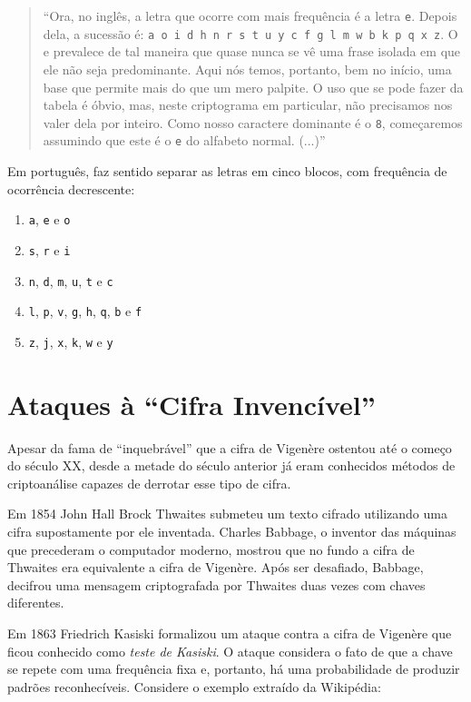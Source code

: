 \begin{quote}
``Ora, no inglês, a letra que ocorre com mais frequência é a letra {\tt e}. 
Depois dela, a sucessão é: {\tt a o i d h n r s t u y c f g l m w b k p q x z}. 
O e prevalece de tal maneira que quase nunca se vê uma frase isolada em que ele não seja predominante. 
Aqui nós temos, portanto, bem no início, uma base que permite mais do que um mero palpite. 
O uso que se pode fazer da tabela é óbvio, mas, neste criptograma em particular, não precisamos nos valer dela por inteiro. 
Como nosso caractere dominante é o {\tt 8}, começaremos assumindo que este é o {\tt e} do alfabeto normal. (...)''
\end{quote}

Em português, faz sentido separar as letras em cinco blocos, com frequência de ocorrência decrescente:
\begin{enumerate}
\item {\tt a}, {\tt e} e {\tt o}
\item {\tt s}, {\tt r} e {\tt i}
\item {\tt n}, {\tt d}, {\tt m}, {\tt u}, {\tt t} e {\tt c}
\item {\tt l}, {\tt p}, {\tt v}, {\tt g}, {\tt h}, {\tt q}, {\tt b} e {\tt f}
\item {\tt z}, {\tt j}, {\tt x}, {\tt k}, {\tt w} e {\tt y}
\end{enumerate}

\section{Ataques à ``Cifra Invencível''}
\label{sec:criptoanalise-vegenere}

Apesar da fama de ``inquebrável'' que a cifra de Vigenère ostentou até o começo do século XX, desde a metade do século anterior já eram conhecidos métodos de criptoanálise capazes de derrotar esse tipo de cifra.

Em 1854 John Hall Brock Thwaites submeteu um texto cifrado utilizando uma cifra supostamente por ele inventada.
Charles Babbage, o inventor das máquinas que precederam o computador moderno, mostrou que no fundo a cifra de Thwaites era equivalente a cifra de Vigenère.
Após ser desafiado, Babbage, decifrou uma mensagem criptografada por Thwaites duas vezes com chaves diferentes.

Em 1863 Friedrich Kasiski formalizou um ataque contra a cifra de Vigenère que ficou conhecido como {\em teste de Kasiski}.
O ataque considera o fato de que a chave se repete com uma frequência fixa e, portanto, há uma probabilidade de produzir padrões reconhecíveis.
Considere o exemplo extraído da Wikipédia:

